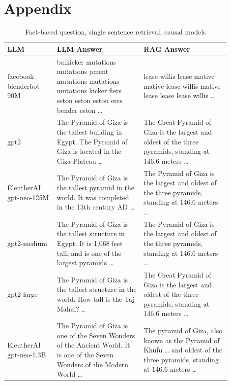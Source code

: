 \documentclass{wseas}
\begin{document}
    
\onecolumn
\section*{Appendix}


\begin{table}[htbp]
  \centering
  \caption{Fact-based question, single sentence retrieval, causal models}
  \label{tab:experiment_R_1_sentence_Q_fact_M_casual_table}
    \begin{tabular}{|p{0.20\linewidth}|p{0.35\linewidth}|p{0.35\linewidth}|}
      \hline
      \textbf{LLM} & \textbf{LLM Answer} & \textbf{RAG Answer} \\ \hline
      facebook blenderbot-90M & balkicker mutations mutations pment mutations mutations mutations kicker fiers eston eston eston eres bender eston \ldots{} & lease willis lease mative mative lease willis mative lease lease lease willis \ldots{} \\ \hline
      gpt2 & The Pyramid of Giza is the tallest building in Egypt. The Pyramid of Giza is located in the Giza Plateau \ldots{} & The Great Pyramid of Giza is the largest and oldest of the three pyramids, standing at 146.6 meters \ldots{} \\ \hline
      EleutherAI gpt-neo-125M & The Pyramid of Giza is the tallest pyramid in the world. It was completed in the 13th century AD \ldots{} & The Pyramid of Giza is the largest and oldest of the three pyramids, standing at 146.6 meters \ldots{} \\ \hline
      gpt2-medium & The Pyramid of Giza is the tallest structure in Egypt. It is 1,068 feet tall, and is one of the largest pyramids \ldots{} & The Pyramid of Giza is the largest and oldest of the three pyramids, standing at 146.6 meters \ldots{} \\ \hline
      gpt2-large & The Pyramid of Giza is the tallest structure in the world. How tall is the Taj Mahal? \ldots{} & The Great Pyramid of Giza is the largest and oldest of the three pyramids, standing at 146.6 meters \ldots{} \\ \hline
      EleutherAI gpt-neo-1.3B & The Pyramid of Giza is one of the Seven Wonders of the Ancient World. It is one of the Seven Wonders of the Modern World \ldots{} & The pyramid of Giza, also known as the Pyramid of Khufu \ldots{} and oldest of the three pyramids, standing at 146.6 meters \ldots{} \\ \hline
    \end{tabular}
\end{table}
\end{document}
